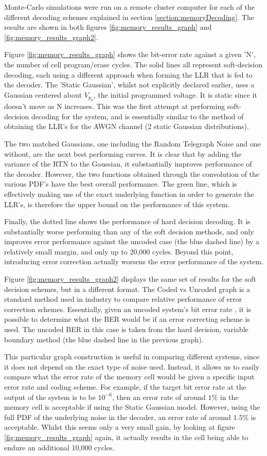 \documentclass[11pt]{article}
\numberwithin{equation}{subsection}
\begin{document}
Monte-Carlo simulations were run on a remote cluster computer for each of the different decoding schemes explained in section \ref{section:memoryDecoding}. The results are shown in both figures \ref{fig:memory_results_graph} and \ref{fig:memory_results_graph2}.

Figure \ref{fig:memory_results_graph} shows the bit-error rate against a given 'N', the number of cell program/erase cycles. The solid lines all represent soft-decision decoding, each using a different approach when forming the LLR that is fed to the decoder. The 'Static Gaussian', whilst not explicitly declared earlier, uses a Gaussian centered about $V_{p_0}$, the initial programmed voltage. It is static since it doesn't move as N increases. This was the first attempt at performing soft-decision decoding for the system, and is essentially similar to the method of obtaining the LLR's for the AWGN channel (2 static Gaussian distributions).

The two matched Gaussians, one including the Random Telegraph Noise and one without, are the next best performing curves. It is clear that by adding the variance of the RTN to the Gaussian, it substantially improves performance of the decoder. However, the two functions obtained through the convolution of the various PDF's have the best overall performance. The green line, which is effectively making use of the exact underlying function in order to generate the LLR's, is therefore the upper bound on the performance of this system. 

Finally, the dotted line shows the performance of hard decision decoding. It is substantially worse performing than any of the soft decision methods, and only improves error performance against the uncoded case (the blue dashed line) by a relatively small margin, and only up to 20,000 cycles. Beyond this point, introducing error correction actually worsens the error performance of the system. 

Figure \ref{fig:memory_results_graph2} displays the same set of results for the soft decision schemes, but in a different format. The Coded vs Uncoded graph is a standard method used in industry to compare relative performance of error correction schemes. Essentially, given an uncoded system's bit error rate , it is possible to determine what the BER would be if an error correcting scheme is used. The uncoded BER in this case is taken from the hard decision, variable boundary method (the blue dashed line in the previous graph).

This particular graph construction is useful in comparing different systems, since it does not depend on the exact type of noise used. Instead, it allows us to easily compare what the error rate of the memory cell would be given a specific input error rate and coding scheme. For example, if the target bit error rate at the output of the system is to be $10^{-6}$, then an error rate of around $1\%$ in the memory cell is acceptable if using the Static Gaussian model. However, using the full PDF of the underlying noise in the decoder, an error rate of around $1.5\%$ is acceptable. Whilst this seems only a very small gain, by looking at figure \ref{fig:memory_results_graph} again, it actually results in the cell being able to endure an additional 10,000 cycles.
\end{document}
